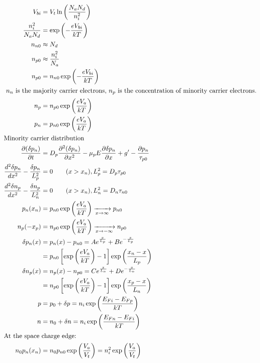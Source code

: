 \begin{columns}
{\begin{align*}
        V_{bi}&=V_t\ln\left( \frac{N_aN_d}{n_i^2} \right)\\ 
        \frac{n_i^2}{N_aN_d}&=\exp\left( -\frac{eV_{bi}}{kT} \right)\\
        n_{n0}&\approx N_d\\
        n_{p0}&\approx \frac{n_i^2}{N_a}\\
        n_{p0}&=n_{n0}\exp\left( -\frac{eV_{bi}}{kT} \right)\\
        \intertext{ $n_{n}$ is the majority carrier electrons, $n_{p}$ is the concentration of minority carrier electrons.}
        n_p&=n_{p0}\exp\left( \frac{eV_a}{kT} \right)\\
        p_n&=p_{n0}\exp\left( \frac{eV_a}{kT} \right)\\
        \intertext{Minority carrier distribution}
        \frac{\partial (\delta p_n)}{\partial t}&=D_p \frac{\partial^2(\delta p_n)}{\partial x^2}-\mu_pE \frac{\partial\delta p_n}{\partial x}+g'-\frac{\partial p_n}{\tau_{p0}}\\
        \frac{d^2\delta p_n}{dx^2}-\frac{\delta p_n}{L_{p}^2}&=0 \qquad (x>x_n),L_{p}^2=D_p\tau_{p0}\\
        \frac{d^2\delta n_p}{dx^2}-\frac{\delta n_p}{L_{n}^2}&=0 \qquad (x>x_n),L_{n}^2=D_n\tau_{n0}\\
        p_n(x_n)&=p_{n0}\exp\left( \frac{eV_a}{kT} \right) \xrightarrow[x\rightarrow\infty]{}p_{n0}\\
        n_p(-x_p)&=n_{p0}\exp\left( \frac{eV_a}{kT} \right)\xrightarrow[x\rightarrow-\infty]{}n_{p0}\\
        \delta p_{n}(x)&=p_n(x)-p_{n0}=Ae^{\frac{x}{L_p}}+Be^{-\frac{x}{L_p}}\\
        &=p_{n0}\left[ \exp\left( \frac{eV_a}{kT} \right)-1 \right]\exp\left( \frac{x_n-x}{L_p} \right)\\
        \delta n_{p}(x)&=n_p(x)-n_{p0}=Ce^{\frac{x}{L_n}}+De^{-\frac{x}{L_n}}\\
        &=n_{p0}\left[ \exp\left( \frac{eV_a}{kT} \right)-1 \right]\exp\left( \frac{x_p-x}{L_n} \right)\\
        p&=p_0+\delta p=n_i\exp\left( \frac{E_{Fi}-E_{Fp}}{kT} \right)\\
        n&=n_0+\delta n=n_i\exp\left( \frac{E_{Fn}-E_{Fi}}{kT} \right)\\
        \intertext{At the space charge edge:}
        n_0p_n(x_n)&=n_0p_{n0}\exp\left( \frac{V_a}{V_t} \right)=n_i^2\exp\left( \frac{V_a}{V_t} \right)\\

\end{align*}}
\end{columns}
